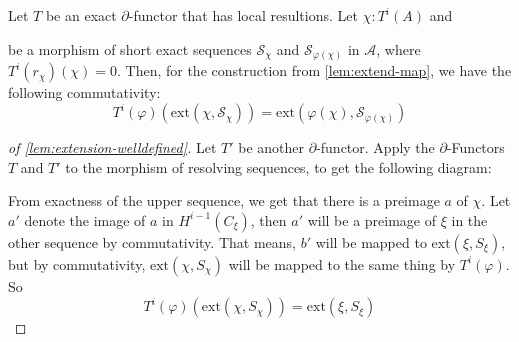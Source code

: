 \begin{lemma}
  \label{lem:extension-welldefined}
  Let $T$ be an exact $\partial$-functor that has local resultions.
  Let $\chi:T^i(A)$ and
  \begin{center}
  \end{center}
  be a morphism of short exact sequences ${\mathcal S}_\chi$ and $\mathcal{S}_{\varphi(\chi)}$ in $\mathcal A$,
  where $T^i(r_\chi)(\chi)=0$.
  Then, for the construction from \cref{lem:extend-map}, we have the following commutativity:
  \[ T^i(\varphi)(\mathrm{ext}(\chi,{\mathcal S}_\chi)) = \mathrm{ext}(\varphi(\chi),\mathcal{S}_{\varphi(\chi)}) \]
\end{lemma}

\begin{proof}[of \cref{lem:extension-welldefined}]
  Let $T'$ be another $\partial$-functor.
  Apply the $\partial$-Functors $T$ and $T'$ to the morphism of resolving sequences, to get the following diagram:
  \begin{center}
  \end{center}
  From exactness of the upper sequence, we get that there is a preimage $a$ of $\chi$.
  Let $a'$ denote the image of $a$ in $H^{i-1}(C_\xi)$,
  then $a'$ will be a preimage of $\xi$ in the other sequence by commutativity.
  That means, $b'$ will be mapped to $ \mathrm{ext}(\xi,S_\xi)$,
  but by commutativity, $\mathrm{ext}(\chi,S_\chi)$ will be mapped to the same thing by $T^i(\varphi)$.
  So
  \[ T^i(\varphi)(\mathrm{ext}(\chi,S_\chi))=\mathrm{ext}(\xi,S_\xi)\]  
\end{proof}


